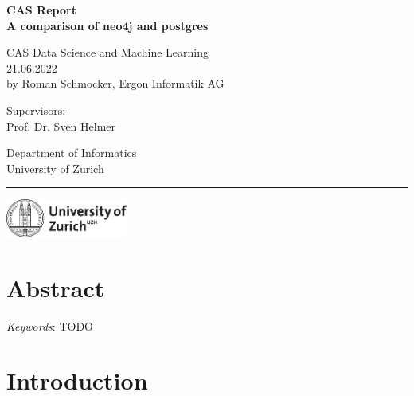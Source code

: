 \documentclass[11pt, a4paper,oneside,chapterprefix=false]{scrbook}
\begin{document}
\frontmatter
\begin{titlepage}
	\setlength{\parindent}{0cm}
	\addtolength{\textheight}{1.0cm}
	\vspace{0.5cm}
	\sffamily\Huge
	{\textbf {CAS Report \\ A comparison of neo4j and postgres}}

	\vfill \vfill \vfill

	\vfill
	\textsf\Large
	CAS Data Science and Machine Learning \\[0.5cm]\large
	21.06.2022\\[0.5cm]
	\large
	by Roman Schmocker, Ergon Informatik AG

	\vfill \vfill \vfill
	\begin{minipage}[b]{0.5\textwidth}
	Supervisors: \\
	Prof. Dr. Sven Helmer
	\end{minipage}
	\begin{minipage}[b]{0.5\textwidth} \raggedleft
	Department of Informatics \\
	University of Zurich
	\end{minipage}

	\vfill
	\hrule
	\vspace{0.5cm}
	\includegraphics*[width=0.3\textwidth]{figures/uzh_logo} \hfill
\end{titlepage}


\chapter{Abstract} \label{chp:abstract}


{\em Keywords}: TODO

\tableofcontents

\mainmatter

\chapter{Introduction} \label{chp:introduction}
\end{document}
